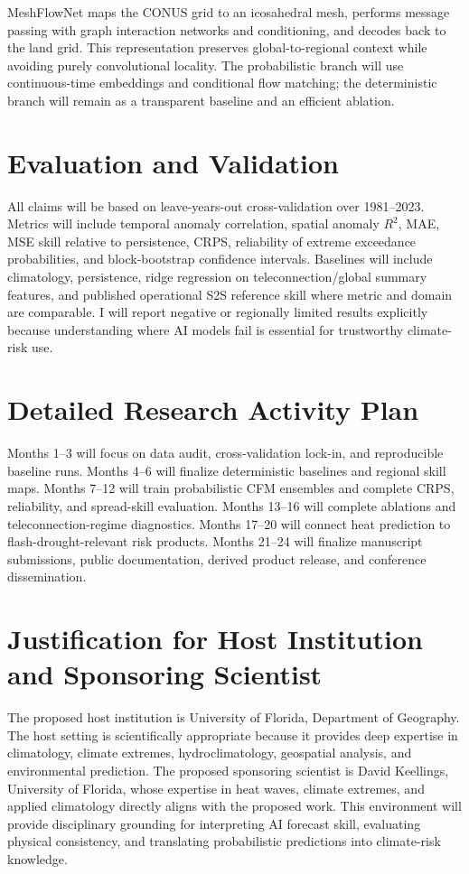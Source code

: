 \documentclass[11pt,letterpaper]{article}
\begin{document}
MeshFlowNet maps the CONUS grid to an icosahedral mesh, performs message passing with graph interaction networks and conditioning, and decodes back to the land grid. This representation preserves global-to-regional context while avoiding purely convolutional locality. The probabilistic branch will use continuous-time embeddings and conditional flow matching; the deterministic branch will remain as a transparent baseline and an efficient ablation.

\section*{Evaluation and Validation}
All claims will be based on leave-years-out cross-validation over 1981--2023. Metrics will include temporal anomaly correlation, spatial anomaly $R^2$, MAE, MSE skill relative to persistence, CRPS, reliability of extreme exceedance probabilities, and block-bootstrap confidence intervals. Baselines will include climatology, persistence, ridge regression on teleconnection/global summary features, and published operational S2S reference skill where metric and domain are comparable. I will report negative or regionally limited results explicitly because understanding where AI models fail is essential for trustworthy climate-risk use.

\section*{Detailed Research Activity Plan}
Months 1--3 will focus on data audit, cross-validation lock-in, and reproducible baseline runs. Months 4--6 will finalize deterministic baselines and regional skill maps. Months 7--12 will train probabilistic CFM ensembles and complete CRPS, reliability, and spread-skill evaluation. Months 13--16 will complete ablations and teleconnection-regime diagnostics. Months 17--20 will connect heat prediction to flash-drought-relevant risk products. Months 21--24 will finalize manuscript submissions, public documentation, derived product release, and conference dissemination.

\section*{Justification for Host Institution and Sponsoring Scientist}
The proposed host institution is University of Florida, Department of Geography. The host setting is scientifically appropriate because it provides deep expertise in climatology, climate extremes, hydroclimatology, geospatial analysis, and environmental prediction. The proposed sponsoring scientist is David Keellings, University of Florida, whose expertise in heat waves, climate extremes, and applied climatology directly aligns with the proposed work. This environment will provide disciplinary grounding for interpreting AI forecast skill, evaluating physical consistency, and translating probabilistic predictions into climate-risk knowledge.
\end{document}

